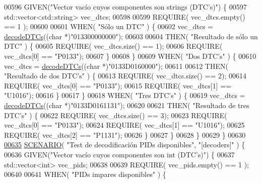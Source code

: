 \begin{DoxyCode}
{{{00596     GIVEN(\textcolor{stringliteral}{"Vector vacío cuyos componentes son strings (DTC's)"}) \{
00597         std::vector<std::string> vec\_dtcs;
00598 
00599         REQUIRE( vec\_dtcs.empty() == 1 );
00600 
00601         WHEN( \textcolor{stringliteral}{"Sólo un DTC"} ) \{
00602             vec\_dtcs = \hyperlink{decoders_8cpp_aac9b3d4ea17ee4dbbdf755b0b510137a}{decodeDTCs}((\textcolor{keywordtype}{char} *)\textcolor{stringliteral}{"013300000000"});
00603 
00604             THEN( \textcolor{stringliteral}{"Resultado de sólo un DTC"} ) \{
00605                 REQUIRE( vec\_dtcs.size() == 1);
00606                 REQUIRE( vec\_dtcs[0] == \textcolor{stringliteral}{"P0133"});
00607             \}
00608         \}
00609         WHEN( \textcolor{stringliteral}{"Dos DTC's"} ) \{
00610             vec\_dtcs = \hyperlink{decoders_8cpp_aac9b3d4ea17ee4dbbdf755b0b510137a}{decodeDTCs}((\textcolor{keywordtype}{char} *)\textcolor{stringliteral}{"0133D0160000"});
00611 
00612             THEN( \textcolor{stringliteral}{"Resultado de dos DTC's"} ) \{
00613                 REQUIRE( vec\_dtcs.size() == 2);
00614                 REQUIRE( vec\_dtcs[0] == \textcolor{stringliteral}{"P0133"});
00615                 REQUIRE( vec\_dtcs[1] == \textcolor{stringliteral}{"U1016"});
00616             \}
00617         \}
00618         WHEN( \textcolor{stringliteral}{"Tres DTC's"} ) \{
00619             vec\_dtcs = \hyperlink{decoders_8cpp_aac9b3d4ea17ee4dbbdf755b0b510137a}{decodeDTCs}((\textcolor{keywordtype}{char} *)\textcolor{stringliteral}{"0133D0161131"});
00620 
00621             THEN( \textcolor{stringliteral}{"Resultado de tres DTC's"} ) \{
00622                 REQUIRE( vec\_dtcs.size() == 3);
00623                 REQUIRE( vec\_dtcs[0] == \textcolor{stringliteral}{"P0133"});
00624                 REQUIRE( vec\_dtcs[1] == \textcolor{stringliteral}{"U1016"});
00625                 REQUIRE( vec\_dtcs[2] == \textcolor{stringliteral}{"P1131"});
00626             \}
00627         \}
00628     \}
00629 \}
00630 
\hyperlink{UnitTestCase_8cpp_afcf7b592e5ac913ea9c83936bfc18227}{00635} \hyperlink{UnitTestCase_8cpp_aa6afb62ebdd4c3e07996c995f623eb6b}{SCENARIO}( \textcolor{stringliteral}{"Test de decodificación PIDs disponibles"}, \textcolor{stringliteral}{"[decoders]"} ) \{
00636     GIVEN(\textcolor{stringliteral}{"Vector vacío cuyos componentes son int (DTC's)"}) \{
00637         std::vector<int> vec\_pids;
00638 
00639         REQUIRE( vec\_pids.empty() == 1 );
00640 
00641         WHEN( \textcolor{stringliteral}{"PIDs impares disponibles"} ) \{
}}}
\end{DoxyCode}
